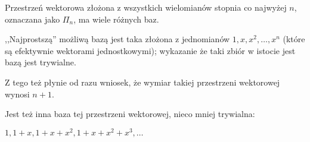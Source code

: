 Przestrzeń wektorowa złożona z wszystkich wielomianów stopnia co najwyżej \(n\), oznaczana jako \(\Pi_n\), ma wiele różnych baz.

,,Najprostszą'' możliwą bazą jest taka złożona z jednomianów \(1, x, x^2, \dots, x^{n}\) (które są efektywnie wektorami jednostkowymi); wykazanie że taki zbiór w istocie jest bazą jest trywialne. 

Z tego też płynie od razu wniosek, że wymiar takiej przestrzeni wektorowej wynosi \(n+1\). 

Jest też inna baza tej przestrzeni wektorowej, nieco mniej trywialna: 

\(1, 1+x, 1+x+x^2, 1+x+x^2+x^3, \dots\)